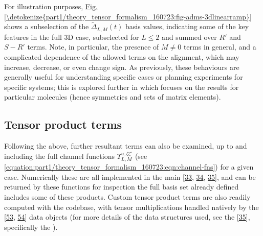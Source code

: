 \documentclass[letterpaper,table,10pt,english]{jupyterBook}
\begin{document}
\sphinxAtStartPar
For illustration purposes, \hyperref[\detokenize{part1/theory_tensor_formalism_160723:fig-adms-3dlinearramp}]{Fig.\@ \ref{\detokenize{part1/theory_tensor_formalism_160723:fig-adms-3dlinearramp}}} shows a subselection of the \(\tilde{\Delta}_{L,M}(t)\) basis values, indicating some of the key features in the full 3D case, subselected for \(L\leq2\) and summed over \(R'\) and \(S-R'\) terms. Note, in particular, the presence of \(M\neq0\) terms in general, and a complicated dependence of the allowed terms on the alignment, which may increase, decrease, or even change sign. As previously, these behaviours are generally useful for understanding specific cases or planning experiments for specific systems; this is explored further in {\hyperref[\detokenize{part2/extracting_matrix_elements_overview_270423:chpt-extracting-matrix-elements-overview}]{}} which focuses on the results for particular molecules (hence symmetries and sets of matrix elements).


\subsection{Tensor product terms}
\label{\detokenize{part1/theory_tensor_formalism_160723:tensor-product-terms}}\label{\detokenize{part1/theory_tensor_formalism_160723:sec-theory-tensor-products}}
\sphinxAtStartPar
Following the above, further resultant terms can also be examined, up to and including the full channel functions \(\varUpsilon_{L,M}^{u,\zeta\zeta'}\) (see \eqref{equation:part1/theory_tensor_formalism_160723:eqn:channel-fns}) for a given case. Numerically these are all implemented in the main  {[}\hyperlink{cite.backmatter/bibliography:id665}{33}, \hyperlink{cite.backmatter/bibliography:id607}{34}, \hyperlink{cite.backmatter/bibliography:id605}{35}{]}, and can be returned by these functions for inspection \sphinxhyphen{} the full basis set already defined includes some of these products. Custom tensor product terms are also readily computed with the codebase, with tensor multiplications handled natively by the  {[}\hyperlink{cite.backmatter/bibliography:id697}{53}, \hyperlink{cite.backmatter/bibliography:id973}{54}{]} data objects (for more details of the data structures used, see the  {[}\hyperlink{cite.backmatter/bibliography:id605}{35}{]}, specifically the ).
\end{document}
